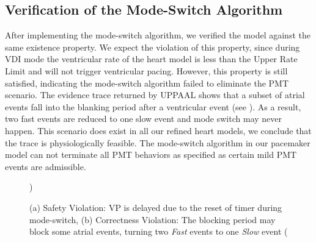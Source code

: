 \subsection{Verification of the Mode-Switch Algorithm}
After implementing the mode-switch algorithm, we verified the model against the same existence property. We expect the violation of this property, since during VDI mode the ventricular rate of the heart model is less than the Upper Rate Limit and will not trigger ventricular pacing. However, this property is still satisfied, indicating the mode-switch algorithm failed to eliminate the PMT scenario. The evidence trace returned by UPPAAL shows that a subset of atrial events fall into the blanking period after a ventricular event (see ). As a result, two fast events are reduced to one slow event and mode switch may never happen. This scenario does exist in all our refined heart models, we conclude that the trace is physiologically feasible. The mode-switch algorithm in our pacemaker model can not terminate all PMT behaviors as specified as certain mild PMT events are admissible.
\begin{figure}
\centering
		\vspace{-10pt}
	\caption{(a) Safety Violation: VP is delayed due to the reset of timer during mode-switch, (b) Correctness Violation: The blocking period may block some atrial events, turning two \emph{Fast} events to one \emph{Slow} event (\cite{TACAS12}})
\vspace{-20pt}
\end{figure} 
